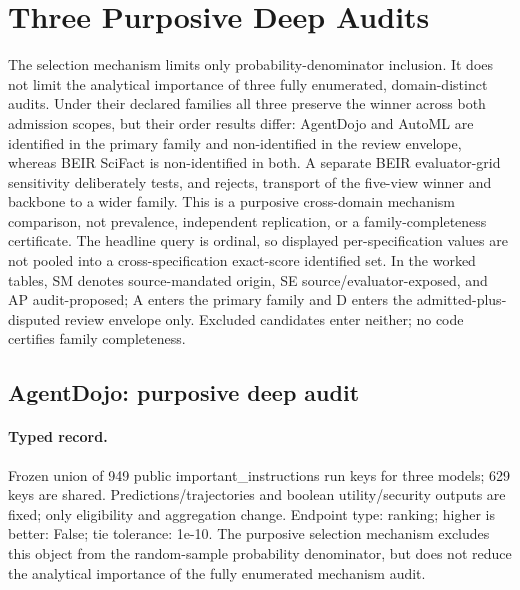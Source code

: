 \section{Three Purposive Deep Audits}\label{app:r8-deep-three}

The selection mechanism limits only probability-denominator inclusion.  It does not limit the analytical importance of three fully enumerated, domain-distinct audits.  Under their declared families all three preserve the winner across both admission scopes, but their order results differ: AgentDojo and AutoML are identified in the primary family and non-identified in the review envelope, whereas BEIR SciFact is non-identified in both.  A separate BEIR evaluator-grid sensitivity deliberately tests, and rejects, transport of the five-view winner and backbone to a wider family.  This is a purposive cross-domain mechanism comparison, not prevalence, independent replication, or a family-completeness certificate.  The headline query is ordinal, so displayed per-specification values are not pooled into a cross-specification exact-score identified set.  In the worked tables, SM denotes source-mandated origin, SE source/evaluator-exposed, and AP audit-proposed; A enters the primary family and D enters the admitted-plus-disputed review envelope only.  Excluded candidates enter neither; no code certifies family completeness.

\subsection{AgentDojo: purposive deep audit}\label{app:r8-agentdojo-v0-1-35}

\paragraph{Typed record.} Frozen union of 949 public important\_instructions run keys for three models; 629 keys are shared. Predictions/trajectories and boolean utility/security outputs are fixed; only eligibility and aggregation change. Endpoint type: ranking; higher is better: False; tie tolerance: 1e-10. The purposive selection mechanism excludes this object from the random-sample probability denominator, but does not reduce the analytical importance of the fully enumerated mechanism audit.

